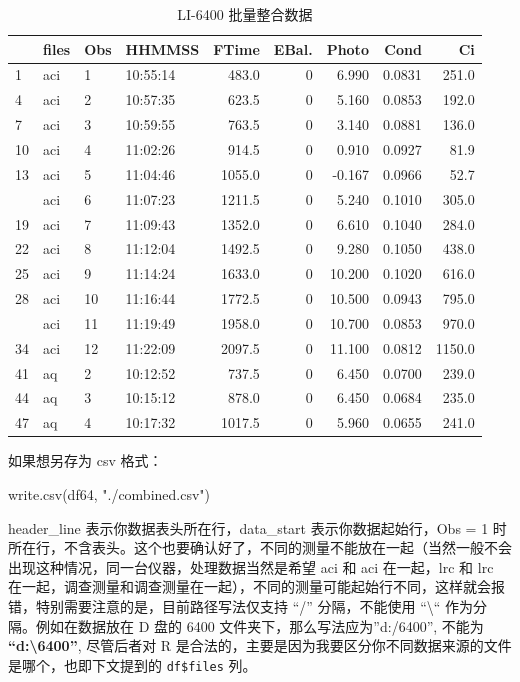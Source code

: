 \documentclass[
]{krantz}
\makeatletter
\newenvironment{Shaded}{\begin{snugshade}}{\end{snugshade}}
\newcommand{\FunctionTok}[1]{\textcolor[rgb]{0.00,0.00,0.00}{#1}}
\newcommand{\NormalTok}[1]{#1}
\newcommand{\StringTok}[1]{\textcolor[rgb]{0.31,0.60,0.02}{#1}}
\newenvironment{kframe}{%
\medskip{}
\setlength{\fboxsep}{.8em}
 \def\at@end@of@kframe{}%
 \ifinner\ifhmode%
  \def\at@end@of@kframe{\end{minipage}}%
  \begin{minipage}{\columnwidth}%
 \fi\fi%
 \def\FrameCommand##1{\hskip\@totalleftmargin \hskip-\fboxsep
 \colorbox{shadecolor}{##1}\hskip-\fboxsep
     \hskip-\linewidth \hskip-\@totalleftmargin \hskip\columnwidth}%
 \MakeFramed {\advance\hsize-\width
   \@totalleftmargin\z@ \linewidth\hsize
   \@setminipage}}%
 {\par\unskip\endMakeFramed%
 \at@end@of@kframe}
\renewenvironment{Shaded}{\begin{kframe}}{\end{kframe}}
\makeatother
\begin{document}
\begin{table}

\caption{\label{tab:unnamed-chunk-5}LI-6400 批量整合数据}
\centering
\begin{tabular}[t]{llllrrrrr}
\toprule
  & files & Obs & HHMMSS & FTime & EBal. & Photo & Cond & Ci\\
\midrule
1 & aci & 1 & 10:55:14 & 483.0 & 0 & 6.990 & 0.0831 & 251.0\\
4 & aci & 2 & 10:57:35 & 623.5 & 0 & 5.160 & 0.0853 & 192.0\\
7 & aci & 3 & 10:59:55 & 763.5 & 0 & 3.140 & 0.0881 & 136.0\\
10 & aci & 4 & 11:02:26 & 914.5 & 0 & 0.910 & 0.0927 & 81.9\\
13 & aci & 5 & 11:04:46 & 1055.0 & 0 & -0.167 & 0.0966 & 52.7\\
\addlinespace
16 & aci & 6 & 11:07:23 & 1211.5 & 0 & 5.240 & 0.1010 & 305.0\\
19 & aci & 7 & 11:09:43 & 1352.0 & 0 & 6.610 & 0.1040 & 284.0\\
22 & aci & 8 & 11:12:04 & 1492.5 & 0 & 9.280 & 0.1050 & 438.0\\
25 & aci & 9 & 11:14:24 & 1633.0 & 0 & 10.200 & 0.1020 & 616.0\\
28 & aci & 10 & 11:16:44 & 1772.5 & 0 & 10.500 & 0.0943 & 795.0\\
\addlinespace
31 & aci & 11 & 11:19:49 & 1958.0 & 0 & 10.700 & 0.0853 & 970.0\\
34 & aci & 12 & 11:22:09 & 2097.5 & 0 & 11.100 & 0.0812 & 1150.0\\
41 & aq & 2 & 10:12:52 & 737.5 & 0 & 6.450 & 0.0700 & 239.0\\
44 & aq & 3 & 10:15:12 & 878.0 & 0 & 6.450 & 0.0684 & 235.0\\
47 & aq & 4 & 10:17:32 & 1017.5 & 0 & 5.960 & 0.0655 & 241.0\\
\bottomrule
\end{tabular}
\end{table}

如果想另存为 csv 格式：

\begin{Shaded}
\begin{Highlighting}[]
\FunctionTok{write.csv}\NormalTok{(df64, }\StringTok{"./combined.csv"}\NormalTok{)}
\end{Highlighting}
\end{Shaded}

header\_line 表示你数据表头所在行，data\_start 表示你数据起始行，Obs = 1 时所在行，不含表头。这个也要确认好了，不同的测量不能放在一起（当然一般不会出现这种情况，同一台仪器，处理数据当然是希望 aci 和 aci 在一起，lrc 和 lrc 在一起，调查测量和调查测量在一起），不同的测量可能起始行不同，这样就会报错，特别需要注意的是，目前路径写法仅支持 ``/'' 分隔，不能使用 ``\textbackslash`` 作为分隔。例如在数据放在 D 盘的 6400 文件夹下，那么写法应为''d:/6400'', 不能为 \textbf{``d:\textbackslash6400''}, 尽管后者对 R 是合法的，主要是因为我要区分你不同数据来源的文件是哪个，也即下文提到的 \texttt{df\$files} 列。
\end{document}
